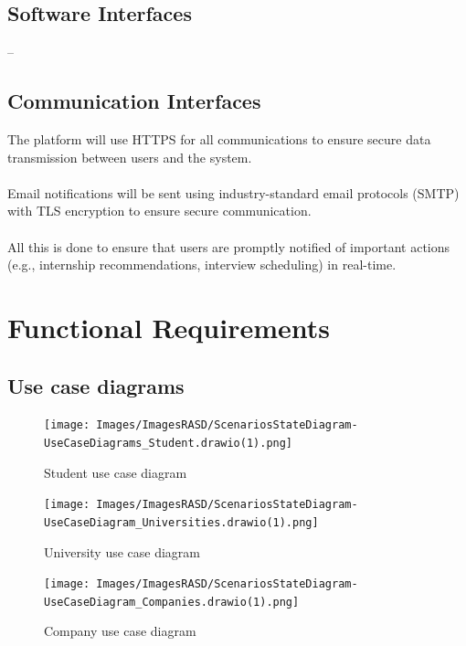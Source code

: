 \subsection{Software Interfaces}

--

\subsection{Communication Interfaces}

The platform will use HTTPS for all communications to ensure secure data transmission between users and the system.\\ \\
Email notifications will be sent using industry-standard email protocols (SMTP) with TLS encryption to ensure secure communication. \\ \\
All this is done to ensure that users are promptly notified of important actions (e.g., internship recommendations, interview scheduling) in real-time.
\newpage

\section{Functional Requirements}
\subsection{Use case diagrams}
\begin{figure}[ht!]
    \centering
    \texttt{[image: Images/ImagesRASD/ScenariosStateDiagram-UseCaseDiagrams\_Student.drawio(1).png]}
    \caption{Student use case diagram}
\end{figure}

\begin{figure}[ht!]
    \centering
    \texttt{[image: Images/ImagesRASD/ScenariosStateDiagram-UseCaseDiagram\_Universities.drawio(1).png]}
    \caption{University use case diagram}

\end{figure}

\begin{figure}[ht!]
    \centering
    \texttt{[image: Images/ImagesRASD/ScenariosStateDiagram-UseCaseDiagram\_Companies.drawio(1).png]}
    \caption{Company use case diagram}

\end{figure}

\clearpage

